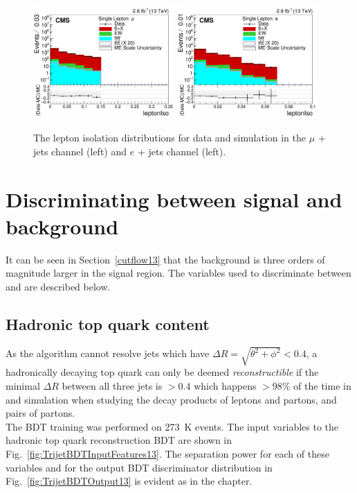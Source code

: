 \begin{figure}
    \includegraphics[width=0.48\textwidth]{images/Run2/leptonIso_StackLogY.pdf}
    \includegraphics[width=0.48\textwidth]{images/Run2/leptonIso_StackLogY_e.pdf}
    \caption{The lepton isolation distributions for data and simulation in the $\mu$ + jets channel (left) and $e$ + jets channel (left).}
    \label{fig:lepiso}
\end{figure}
\pagebreak

\section{Discriminating between signal and background}
\label{sec:discriminating13}
It can be seen in Section~\ref{cutflow13} that the \ttbar background is three orders of magnitude larger in the signal region. The variables used to discriminate between \ttbar and \tttt are described below.

\subsection{Hadronic top quark content}
\label{sec:topContent13}

As the \antikt algorithm cannot resolve jets which have $\Delta R = \sqrt{  \theta^{2} + \phi^{2} } < 0.4$, a hadronically decaying top quark can only be deemed \emph{reconstructible} if the minimal $\Delta R$ between all three jets is $> 0.4$ which happens $> 98\%$ of the time in \ttbar and \tttt simulation when studying the decay products of leptons and partons, and pairs of partons.\\
The BDT training was performed on 273~K \ttbar events. The input variables to the hadronic top quark reconstruction BDT are shown in Fig.~\ref{fig:TrijetBDTInputFeatures13}. The separation power for each of these variables and for the output BDT discriminator distribution in Fig.~\ref{fig:TrijetBDTOutput13} is evident as in the \runone chapter. 

